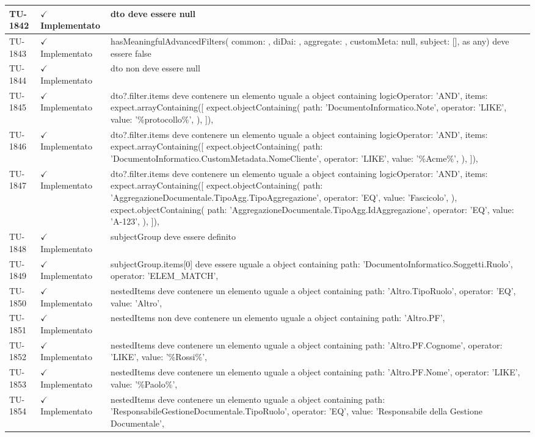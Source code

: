 ﻿\documentclass[a4paper,12pt]{article}
\newcommand{\ok}{\textcolor{green!60!black}{$\checkmark$ Implementato}}
\begin{document}
\begin{longtable}{|p{2cm}|p{3.5cm}|p{9.5cm}|}
\hline
TU-1842 & \ok & dto deve essere null \\
\hline
TU-1843 & \ok & hasMeaningfulAdvancedFilters({ common: {}, diDai: {}, aggregate: {}, customMeta: null, subject: [], } as any) deve essere false \\
\hline
TU-1844 & \ok & dto non deve essere null \\
\hline
TU-1845 & \ok & dto?.filter.items deve contenere un elemento uguale a object containing { logicOperator: 'AND', items: expect.arrayContaining([ expect.objectContaining({ path: 'DocumentoInformatico.Note', operator: 'LIKE', value: '\%protocollo\%', }), ]), } \\
\hline
TU-1846 & \ok & dto?.filter.items deve contenere un elemento uguale a object containing { logicOperator: 'AND', items: expect.arrayContaining([ expect.objectContaining({ path: 'DocumentoInformatico.CustomMetadata.NomeCliente', operator: 'LIKE', value: '\%Acme\%', }), ]), } \\
\hline
TU-1847 & \ok & dto?.filter.items deve contenere un elemento uguale a object containing { logicOperator: 'AND', items: expect.arrayContaining([ expect.objectContaining({ path: 'AggregazioneDocumentale.TipoAgg.TipoAggregazione', operator: 'EQ', value: 'Fascicolo', }), expect.objectContaining({ path: 'AggregazioneDocumentale.TipoAgg.IdAggregazione', operator: 'EQ', value: 'A-123', }), ]), } \\
\hline
TU-1848 & \ok & subjectGroup deve essere definito \\
\hline
TU-1849 & \ok & subjectGroup.items[0] deve essere uguale a object containing { path: 'DocumentoInformatico.Soggetti.Ruolo', operator: 'ELEM\_MATCH', } \\
\hline
TU-1850 & \ok & nestedItems deve contenere un elemento uguale a object containing { path: 'Altro.TipoRuolo', operator: 'EQ', value: 'Altro', } \\
\hline
TU-1851 & \ok & nestedItems non deve contenere un elemento uguale a object containing { path: 'Altro.PF', } \\
\hline
TU-1852 & \ok & nestedItems deve contenere un elemento uguale a object containing { path: 'Altro.PF.Cognome', operator: 'LIKE', value: '\%Rossi\%', } \\
\hline
TU-1853 & \ok & nestedItems deve contenere un elemento uguale a object containing { path: 'Altro.PF.Nome', operator: 'LIKE', value: '\%Paolo\%', } \\
\hline
TU-1854 & \ok & nestedItems deve contenere un elemento uguale a object containing { path: 'ResponsabileGestioneDocumentale.TipoRuolo', operator: 'EQ', value: 'Responsabile della Gestione Documentale', } \\

\end{longtable}
\end{document}
